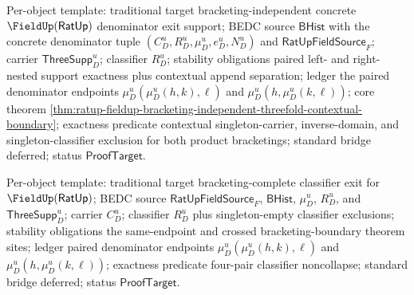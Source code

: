 Per-object template: traditional target bracketing-independent concrete
$\FieldUp(\mathsf{RatUp})$ denominator exit support; BEDC source
$\mathsf{BHist}$ with the concrete denominator tuple
$(C_D^u,R_D^u,\mu_D^u,e_D^u,N_D^u)$ and $\mathsf{RatUpFieldSource}_F$; carrier
$\mathsf{ThreeSupp}_D^u$; classifier $R_D^u$; stability obligations paired
left- and right-nested support exactness plus contextual append separation;
ledger the paired denominator endpoints $\mu_D^u(\mu_D^u(h,k),\ell)$ and
$\mu_D^u(h,\mu_D^u(k,\ell))$; core theorem
\autoref{thm:ratup-fieldup-bracketing-independent-threefold-contextual-boundary};
exactness predicate contextual singleton-carrier, inverse-domain, and
singleton-classifier exclusion for both product bracketings; standard bridge
deferred; status $\mathsf{ProofTarget}$.

Per-object template: traditional target bracketing-complete classifier exit for
$\FieldUp(\mathsf{RatUp})$; BEDC source $\mathsf{RatUpFieldSource}_F$,
$\mathsf{BHist}$, $\mu_D^u$, $R_D^u$, and $\mathsf{ThreeSupp}_D^u$; carrier
$C_D^u$; classifier $R_D^u$ plus singleton-empty classifier exclusions;
stability obligations the same-endpoint and crossed bracketing-boundary theorem
sites; ledger paired denominator endpoints $\mu_D^u(\mu_D^u(h,k),\ell)$ and
$\mu_D^u(h,\mu_D^u(k,\ell))$; exactness predicate four-pair classifier
noncollapse; standard bridge deferred; status $\mathsf{ProofTarget}$.


